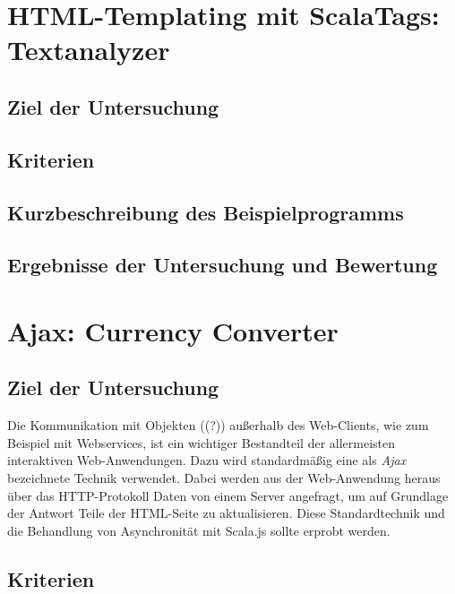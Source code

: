 \documentclass[a4paper, 12pt, hidelinks, listof=totoc, listoftables=totoc, bibliography=totoc]{scrreprt}
\begin{document}
\section{HTML-Templating mit ScalaTags: Textanalyzer}


\subsection{Ziel der Untersuchung}
\subsection{Kriterien}
\subsection{Kurzbeschreibung des Beispielprogramms}
\subsection{Ergebnisse der Untersuchung und Bewertung}


\section{Ajax: Currency Converter}


\subsection{Ziel der Untersuchung}

Die Kommunikation mit Objekten ((?)) außerhalb des Web-Clients, wie zum Beispiel mit Webservices, ist ein wichtiger Bestandteil der allermeisten interaktiven Web-Anwendungen. Dazu wird standardmäßig eine als \textit{Ajax} bezeichnete Technik verwendet. Dabei werden aus der Web-Anwendung heraus über das HTTP-Protokoll Daten von einem Server angefragt, um auf Grundlage der Antwort Teile der HTML-Seite zu aktualisieren. Diese Standardtechnik und die Behandlung von Asynchronität mit Scala.js sollte erprobt werden.

\subsection{Kriterien}
\end{document}

